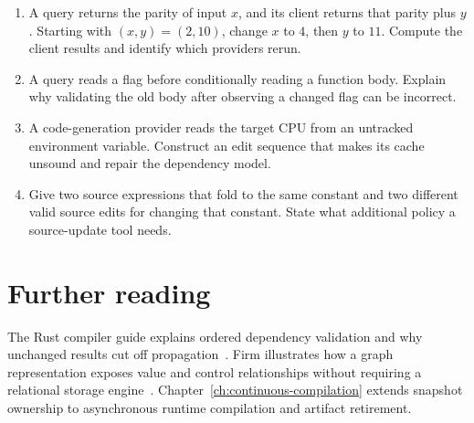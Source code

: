 \begin{enumerate}
\item\label{ex:ch61-cutoff} A query returns the parity of input $x$, and its client returns that parity plus $y$.
Starting with $(x,y)=(2,10)$, change $x$ to $4$, then $y$ to $11$.
Compute the client results and identify which providers rerun.
\item\label{ex:ch61-branch} A query reads a flag before conditionally reading a function body.
Explain why validating the old body after observing a changed flag can be incorrect.
\item\label{ex:ch61-hidden} A code-generation provider reads the target CPU from an untracked environment variable.
Construct an edit sequence that makes its cache unsound and repair the dependency model.
\item\label{ex:ch61-inverse} Give two source expressions that fold to the same constant and two different valid source edits for changing that constant.
State what additional policy a source-update tool needs.
\end{enumerate}

\section{Further reading}
\label{sec:ch61-reading}

The Rust compiler guide explains ordered dependency validation and why unchanged results cut off propagation~\cite{rust-2026-incremental}.
Firm illustrates how a graph representation exposes value and control relationships without requiring a relational storage engine~\cite{braun-2011-firm}.
Chapter~\ref{ch:continuous-compilation} extends snapshot ownership to asynchronous runtime compilation and artifact retirement.

